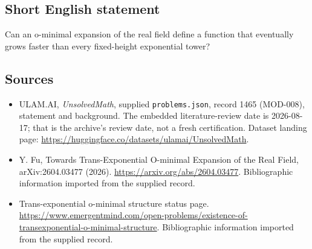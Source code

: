 \documentclass[11pt,a4paper]{article}
\begin{document}
\subsection{Short English statement}

Can an o-minimal expansion of the real field define a function that eventually grows faster than every fixed-height exponential tower?

\subsection{Sources}

{\small

\begin{itemize}

\item[\hypertarget{source:1465:1}{S1}] ULAM.AI, \emph{UnsolvedMath}, supplied \texttt{problems.json}, record 1465 (MOD-008), statement and background. The embedded literature-review date is 2026-08-17; that is the archive’s review date, not a fresh certification. Dataset landing page: \url{https://huggingface.co/datasets/ulamai/UnsolvedMath}.

\item[\hypertarget{source:1465:2}{S2}] Y. Fu, Towards Trans-Exponential O-minimal Expansion of the Real Field, arXiv:2604.03477 (2026). \url{https://arxiv.org/abs/2604.03477}. Bibliographic information imported from the supplied record.

\item[\hypertarget{source:1465:3}{S3}] Trans-exponential o-minimal structure status page. \url{https://www.emergentmind.com/open-problems/existence-of-transexponential-o-minimal-structure}. Bibliographic information imported from the supplied record.

\end{itemize}

}

\label{end:1465}
\end{document}
